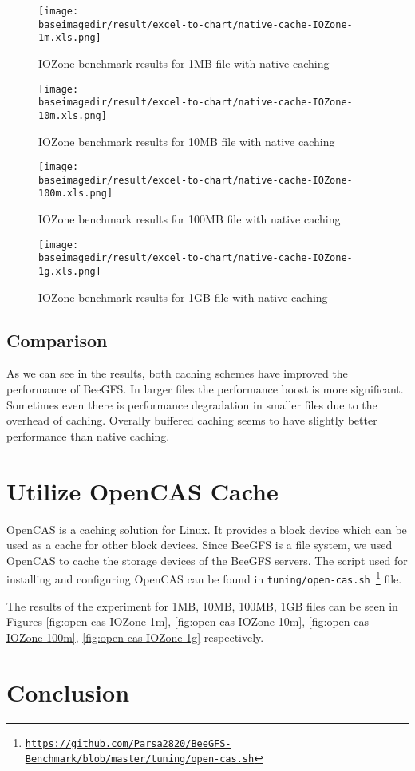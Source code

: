 \documentclass{article}
\newcommand{\baseimagedir}{..}
\begin{document}
\begin{figure}
    \centering
    \texttt{[image: \\baseimagedir/result/excel-to-chart/native-cache-IOZone-1m.xls.png]}
    \caption{IOZone benchmark results for 1MB file with native caching}
    \label{fig:native-IOZone-1m}
\end{figure}

\begin{figure}
    \centering
    \texttt{[image: \\baseimagedir/result/excel-to-chart/native-cache-IOZone-10m.xls.png]}
    \caption{IOZone benchmark results for 10MB file with native caching}
    \label{fig:native-IOZone-10m}
\end{figure}

\begin{figure}
    \centering
    \texttt{[image: \\baseimagedir/result/excel-to-chart/native-cache-IOZone-100m.xls.png]}
    \caption{IOZone benchmark results for 100MB file with native caching}
    \label{fig:native-IOZone-100m}
\end{figure}

\begin{figure}
    \centering
    \texttt{[image: \\baseimagedir/result/excel-to-chart/native-cache-IOZone-1g.xls.png]}
    \caption{IOZone benchmark results for 1GB file with native caching}
    \label{fig:native-IOZone-1g}
\end{figure}


\subsection{Comparison}
As we can see in the results, both caching schemes have improved the performance of BeeGFS. In larger files the performance boost is more significant. Sometimes even there is performance degradation in smaller files due to the overhead of caching. Overally buffered caching seems to have slightly better performance than native caching. 

\section{Utilize OpenCAS Cache}
OpenCAS is a caching solution for Linux. It provides a block device which can be used as a cache for other block devices.
Since BeeGFS is a file system, we used OpenCAS to cache the storage devices of the BeeGFS servers. The script used for installing and configuring OpenCAS can be found in \texttt{tuning/open-cas.sh \footnote{\url{https://github.com/Parsa2820/BeeGFS-Benchmark/blob/master/tuning/open-cas.sh}}} file.

The results of the experiment for 1MB, 10MB, 100MB, 1GB files can be seen in Figures \ref{fig:open-cas-IOZone-1m}, \ref{fig:open-cas-IOZone-10m}, \ref{fig:open-cas-IOZone-100m}, \ref{fig:open-cas-IOZone-1g} respectively.



\section{Conclusion}

\clearpage
\printbibliography
\end{document}
